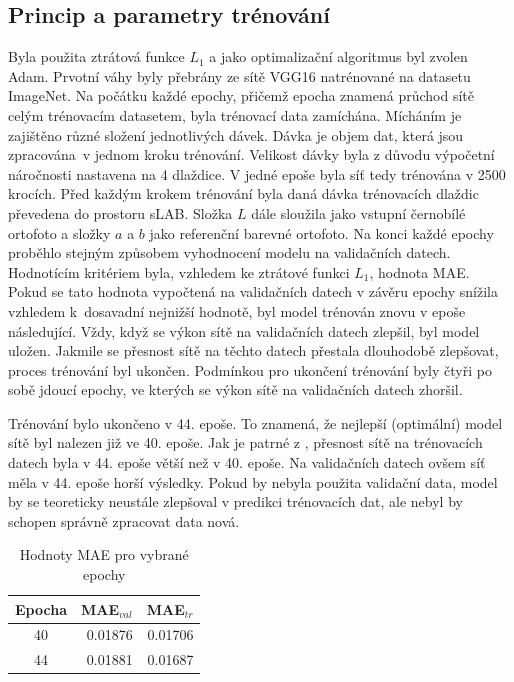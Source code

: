 \subsection{Princip a parametry trénování}

Byla použita ztrátová funkce $L_1$ a jako optimalizační algoritmus byl zvolen Adam. Prvotní váhy byly přebrány ze sítě VGG16 natrénované na datasetu ImageNet. Na počátku každé epochy, přičemž epocha znamená průchod sítě celým trénovacím datasetem, byla trénovací data zamíchána. Mícháním je zajištěno různé složení jednotlivých dávek. Dávka je objem dat, která jsou zpracována~v jednom kroku trénování. Velikost dávky byla z důvodu výpočetní náročnosti nastavena na 4 dlaždice. V jedné epoše byla síť tedy trénována v 2500 krocích. Před každým krokem trénování byla daná dávka trénovacích dlaždic převedena do prostoru sLAB. Složka $L$ dále sloužila jako vstupní černobílé ortofoto a složky $a$ a $b$ jako referenční barevné ortofoto. Na konci každé epochy proběhlo stejným způsobem vyhodnocení modelu na validačních datech. Hodnotícím kritériem byla, vzhledem ke ztrátové funkci $L_1$, hodnota MAE. Pokud se tato hodnota vypočtená na validačních datech v závěru epochy snížila vzhledem k~dosavadní nejnižší hodnotě, byl model trénován znovu v epoše následující. Vždy, když se výkon sítě na validačních datech zlepšil, byl model uložen. Jakmile se přesnost sítě na těchto datech přestala dlouhodobě zlepšovat, proces trénování byl ukončen. Podmínkou pro ukončení trénování byly čtyři po sobě jdoucí epochy, ve kterých se výkon sítě na validačních datech zhoršil.

Trénování bylo ukončeno v 44. epoše. To znamená, že nejlepší (optimální) model sítě byl nalezen již ve 40. epoše. Jak je patrné z , přesnost sítě na trénovacích datech byla v 44. epoše větší než v 40. epoše. Na validačních datech ovšem síť měla v 44. epoše horší výsledky. Pokud by nebyla použita validační data, model by se teoreticky neustále zlepšoval v predikci trénovacích dat, ale nebyl by schopen správně zpracovat data nová.

\begin{table}[H]
  \centering
  \begin{tabular}{|c|r|r|}
    \hline
    \multicolumn{1}{|c}{Epocha}&\multicolumn{1}{|c}{MAE$_{val}$}&\multicolumn{1}{|c|}{MAE$_{tr}$}\\\hline\hline
    40&0.01876&0.01706 \\\hline
    44&0.01881&0.01687 \\\hline
  \end{tabular}
  \caption{Hodnoty MAE pro vybrané epochy}
  \label{tab:MAE}
\end{table}

